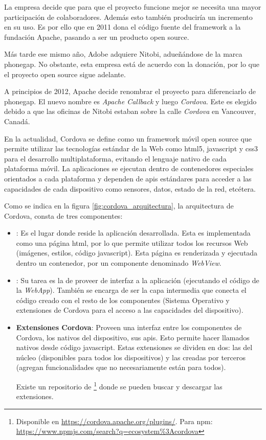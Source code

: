 La empresa decide que para que el proyecto funcione mejor se necesita una mayor participación de colaboradores. Además esto también produciría un incremento en su uso. Es por ello que en 2011 dona el código fuente del \gls{framework} a la fundación Apache, pasando a ser un producto \gls{open source}.

Más tarde ese mismo año, Adobe adquiere Nitobi, adueñándose de la marca \gls{phonegap}. No obstante, esta empresa está de acuerdo con la donación, por lo que el proyecto \gls{open source} sigue adelante.

A principios de 2012, Apache decide renombrar el proyecto para diferenciarlo de \gls{phonegap}. El nuevo nombre es \textit{Apache Callback} y luego \textit{Cordova}. Este es elegido debido a que las oficinas de Nitobi estaban sobre la calle \textit{Cordova} en Vancouver, Canadá.

En la actualidad, Cordova se define como un \gls{framework} móvil \gls{open source} que permite utilizar las tecnologías estándar de la Web como \gls{html}5, \gls{javascript} y \gls{css}3 para el desarrollo multiplataforma, evitando el lenguaje nativo de cada plataforma móvil. La aplicaciones se ejecutan dentro de contenedores especiales orientados a cada plataforma y dependen de \glspl{api} estándares para acceder a las capacidades de cada dispositivo como sensores, datos, estado de la red, etcétera.\cite{apache2017cordovaOverview}

Como se indica en la figura \ref{fig:cordova_arquitectura}, la arquitectura de Cordova, consta de tres componentes:
\begin{itemize}
\item \textbf{}: Es el lugar donde reside la aplicación desarrollada. Esta es implementada como una página \gls{html}, por lo que permite utilizar todos los recursos Web (imágenes, estilos, código \gls{javascript}). Esta página es renderizada y ejecutada dentro un contenedor, por un componente denominado \textit{WebView}.
\item \textbf{}: Su tarea es la de proveer de interfaz a la aplicación (ejecutando el código de la \textit{WebApp}). También se encarga de ser la capa intermedia que conecta el código creado con el resto de los componentes (Sistema Operativo y extensiones de Cordova para el acceso a las capacidades del dispositivo).
\item \textbf{Extensiones Cordova}: Proveen una interfaz entre los componentes de Cordova, los nativos del dispositivo, sus \glspl{api}. Esto permite hacer llamados nativos desde código \gls{javascript}. Estas extensiones se dividen en dos: las del núcleo (disponibles para todos los dispositivos) y las creadas por terceros (agregan funcionalidades que no necesariamente están para todos).

Existe un repositorio de \footnote{Disponible en \url{https://cordova.apache.org/plugins/}. Para npm:  \url{https://www.npmjs.com/search?q=ecosystem\%3Acordova}} donde se pueden buscar y descargar las extensiones.
\end{itemize}


